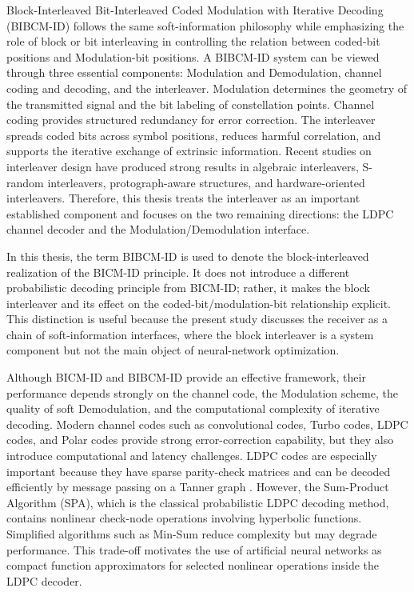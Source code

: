Block-Interleaved Bit-Interleaved Coded Modulation with Iterative Decoding (BIBCM-ID) follows the same soft-information philosophy while emphasizing the role of block or bit interleaving in controlling the relation between coded-bit positions and Modulation-bit positions. A BIBCM-ID system can be viewed through three essential components: Modulation and Demodulation, channel coding and decoding, and the interleaver. Modulation determines the geometry of the transmitted signal and the bit labeling of constellation points. Channel coding provides structured redundancy for error correction. The interleaver spreads coded bits across symbol positions, reduces harmful correlation, and supports the iterative exchange of extrinsic information. Recent studies on interleaver design have produced strong results in algebraic interleavers, S-random interleavers, protograph-aware structures, and hardware-oriented interleavers. Therefore, this thesis treats the interleaver as an important established component and focuses on the two remaining directions: the LDPC channel decoder and the Modulation/Demodulation interface.

In this thesis, the term BIBCM-ID is used to denote the block-interleaved realization of the BICM-ID principle. It does not introduce a different probabilistic decoding principle from BICM-ID; rather, it makes the block interleaver and its effect on the coded-bit/modulation-bit relationship explicit. This distinction is useful because the present study discusses the receiver as a chain of soft-information interfaces, where the block interleaver is a system component but not the main object of neural-network optimization.

Although BICM-ID and BIBCM-ID provide an effective framework, their performance depends strongly on the channel code, the Modulation scheme, the quality of soft Demodulation, and the computational complexity of iterative decoding. Modern channel codes such as convolutional codes, Turbo codes, LDPC codes, and Polar codes provide strong error-correction capability, but they also introduce computational and latency challenges. LDPC codes are especially important because they have sparse parity-check matrices and can be decoded efficiently by message passing on a Tanner graph \cite{gallager1962,mackay1996,richardson2008}. However, the Sum-Product Algorithm (SPA), which is the classical probabilistic LDPC decoding method, contains nonlinear check-node operations involving hyperbolic functions. Simplified algorithms such as Min-Sum reduce complexity but may degrade performance. This trade-off motivates the use of artificial neural networks as compact function approximators for selected nonlinear operations inside the LDPC decoder.

